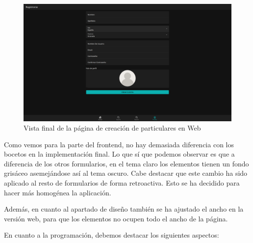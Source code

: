\begin{figure}[H]
	\centering
	\includegraphics[width=0.7\linewidth]{"sprint 2/hu5/impRegistroParticularesWeb"}
	\caption{Vista final de la página de creación de particulares en Web}
	\label{fig:impregistroparticularesweb}
\end{figure}


Como vemos para la parte del frontend, no hay demasiada diferencia con los bocetos en la implementación final. Lo que sí que podemos observar es que a diferencia de los otros formularios, en el tema claro los elementos tienen un fondo grisáceo asemejándose así al tema oscuro. Cabe destacar que este cambio ha sido aplicado al resto de formularios de forma retroactiva. Esto se ha decidido para hacer más homogénea la aplicación.

Además, en cuanto al apartado de diseño también se ha ajustado el ancho en la versión web, para que los elementos no ocupen todo el ancho de la página.

En cuanto a la programación, debemos destacar los siguientes aspectos:

